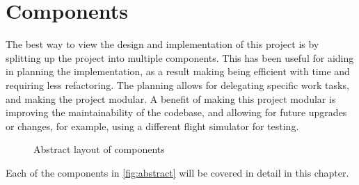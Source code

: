 \documentclass[../dissertation.tex]{subfiles}
\begin{document}
\section{Components}


The best way to view the design and implementation of this project is by
splitting up the project into multiple components.
This has been useful for aiding in planning the implementation, as a result
making being efficient with time and requiring less refactoring. The planning
allows for delegating specific work tasks, and making the project modular.
A benefit of making this project modular is improving the maintainability of the
codebase, and allowing for future upgrades or changes, for example, using a different
flight simulator for testing.

\begin{figure}[H]
\centering
  \caption{Abstract layout of components}
  \label{fig:abstract}
\end{figure}

Each of the components in \autoref{fig:abstract} will be covered in detail in this
chapter.


\end{document}
